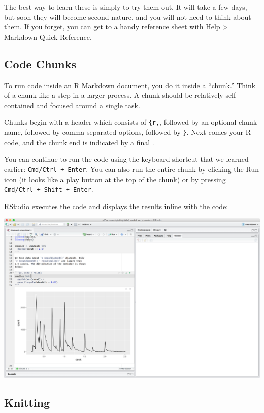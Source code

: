 \documentclass[
]{book}
\begin{document}
The best way to learn these is simply to try them out. It will take a few days, but soon they will become second nature, and you will not need to think about them. If you forget, you can get to a handy reference sheet with Help \textgreater{} Markdown Quick Reference.

\hypertarget{code-chunks}{%
\subsection{Code Chunks}\label{code-chunks}}

To run code inside an R Markdown document, you do it inside a ``chunk.'' Think of a chunk like a step in a larger process. A chunk should be relatively self-contained and focused around a single task.

Chunks begin with a header which consists of \texttt{\textasciigrave{}\textasciigrave{}\textasciigrave{}\{r,}, followed by an optional chunk name, followed by comma separated options, followed by \texttt{\}}. Next comes your R code, and the chunk end is indicated by a final \texttt{\textasciigrave{}\textasciigrave{}\textasciigrave{}}.

You can continue to run the code using the keyboard shortcut that we learned earlier: \texttt{Cmd/Ctrl\ +\ Enter}. You can also run the entire chunk by clicking the Run icon (it looks like a play button at the top of the chunk) or by pressing \texttt{Cmd/Ctrl\ +\ Shift\ +\ Enter}.

RStudio executes the code and displays the results inline with the code:

\includegraphics{img/r-markdown.png}

\hypertarget{knitting}{%
\subsection{Knitting}\label{knitting}}
\end{document}
